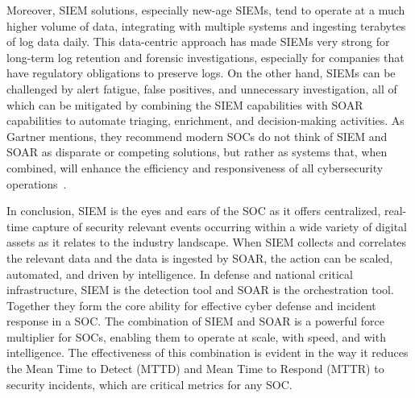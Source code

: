Moreover, SIEM solutions, especially new-age SIEMs, tend to operate at a much higher volume of data, integrating with multiple systems and ingesting terabytes of log data daily. This data-centric approach has made SIEMs very strong for long-term log retention and forensic investigations, especially for companies that have regulatory obligations to preserve logs. On the other hand, SIEMs can be challenged by alert fatigue, false positives, and unnecessary investigation, all of which can be mitigated by combining the SIEM capabilities with SOAR capabilities to automate triaging, enrichment, and decision-making activities. As Gartner mentions, they recommend modern SOCs do not think of SIEM and SOAR as disparate or competing solutions, but rather as systems that, when combined, will enhance the efficiency and responsiveness of all cybersecurity operations~\cite{gartner-siem-soar}.

In conclusion, SIEM is the eyes and ears of the SOC as it offers centralized, real-time capture of security relevant events occurring within a wide variety of digital assets as it relates to the industry landscape. When SIEM collects and correlates the relevant data and the data is ingested by SOAR, the action can be scaled, automated, and driven by intelligence. In defense and national critical infrastructure, SIEM is the detection tool and SOAR is the orchestration tool. Together they form the core ability for effective cyber defense and incident response in a SOC. The combination of SIEM and SOAR is a powerful force multiplier for SOCs, enabling them to operate at scale, with speed, and with intelligence. The effectiveness of this combination is evident in the way it reduces the Mean Time to Detect (MTTD) and Mean Time to Respond (MTTR) to security incidents, which are critical metrics for any SOC.

